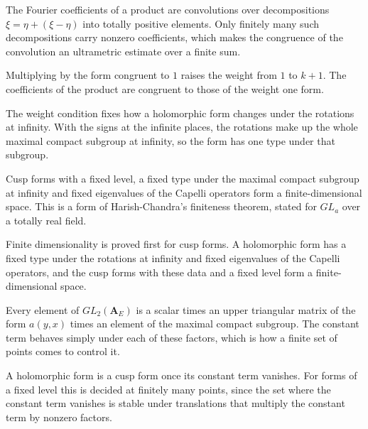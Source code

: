 The Fourier coefficients of a product are convolutions over decompositions $\xi=\eta+(\xi-\eta)$ into totally positive elements. Only finitely many such decompositions carry nonzero coefficients, which makes the congruence of the convolution an ultrametric estimate over a finite sum.

Multiplying by the form congruent to $1$ raises the weight from $1$ to $k+1$. The coefficients of the product are congruent to those of the weight one form.

The weight condition fixes how a holomorphic form changes under the rotations at infinity. With the signs at the infinite places, the rotations make up the whole maximal compact subgroup at infinity, so the form has one type under that subgroup.

Cusp forms with a fixed level, a fixed type under the maximal compact subgroup at infinity and fixed eigenvalues of the Capelli operators form a finite-dimensional space. This is a form of Harish-Chandra's finiteness theorem, stated for $GL_a$ over a totally real field.

Finite dimensionality is proved first for cusp forms. A holomorphic form has a fixed type under the rotations at infinity and fixed eigenvalues of the Capelli operators, and the cusp forms with these data and a fixed level form a finite-dimensional space.

Every element of $GL_2(\mathbf A_E)$ is a scalar times an upper triangular matrix of the form $a(y,x)$ times an element of the maximal compact subgroup. The constant term behaves simply under each of these factors, which is how a finite set of points comes to control it.

A holomorphic form is a cusp form once its constant term vanishes. For forms of a fixed level this is decided at finitely many points, since the set where the constant term vanishes is stable under translations that multiply the constant term by nonzero factors.

